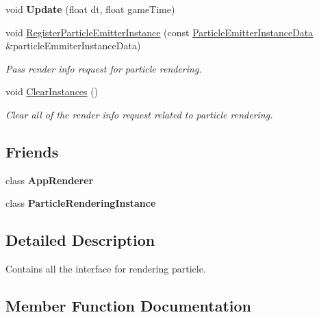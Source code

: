 \begin{DoxyCompactItemize}
\mbox{\label{classParticleRendering_aa7c1d5b5f3fb05f54cb9d4ff24c7caf0}} 
void {\bfseries Update} (float dt, float game\+Time)
\item 
void \hyperlink{classParticleRendering_a766307f91238afe4da6af25b858f472b}{Register\+Particle\+Emitter\+Instance} (const \hyperlink{structParticleEmitterInstanceData}{Particle\+Emitter\+Instance\+Data} \&particle\+Emmiter\+Instance\+Data)
\begin{DoxyCompactList}\small\item\em Pass render info request for particle rendering. \end{DoxyCompactList}\item 
\mbox{\label{classParticleRendering_a9a3893e69f75dd572537b9d2486ebf37}} 
void \hyperlink{classParticleRendering_a9a3893e69f75dd572537b9d2486ebf37}{Clear\+Instances} ()
\begin{DoxyCompactList}\small\item\em Clear all of the render info request related to particle rendering. \end{DoxyCompactList}\end{DoxyCompactItemize}
\subsection*{Friends}
\begin{DoxyCompactItemize}
\item 
\mbox{\label{classParticleRendering_a5f3d064e51c4a3bf9409801632b9a7af}} 
class {\bfseries App\+Renderer}
\item 
\mbox{\label{classParticleRendering_aba9f3240241811e775ef4280a9df4333}} 
class {\bfseries Particle\+Rendering\+Instance}
\end{DoxyCompactItemize}


\subsection{Detailed Description}
Contains all the interface for rendering particle. 

\subsection{Member Function Documentation}
\mbox{\label{classParticleRendering_a38e0d5b06ee499c355b592c071527a7e}} 
